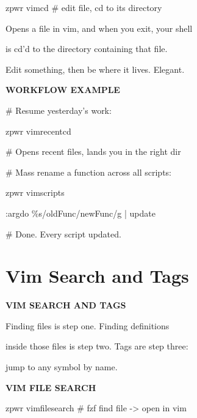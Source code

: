 \documentclass[11pt,a4paper,twoside]{book}
\begin{document}
\begin{codebox}
zpwr vimcd              \# edit file, cd to its directory\\
\end{codebox}

Opens a file in vim, and when you exit, your shell

is cd'd to the directory containing that file.

Edit something, then be where it lives. Elegant.


\vspace{12pt}
{\bfseries\color{neonyellow} WORKFLOW EXAMPLE}\vspace{4pt}

\# Resume yesterday's work:

\begin{codebox}
zpwr vimrecentcd\\
\end{codebox}

\# Opens recent files, lands you in the right dir

\# Mass rename a function across all scripts:

\begin{codebox}
zpwr vimscripts\\
\end{codebox}

:argdo \%s/oldFunc/newFunc/g | update

\# Done. Every script updated.


\vspace{16pt}

\section{Vim Search and Tags}


\vspace{10pt}
{\large\bfseries\color{neoncyan} VIM SEARCH AND TAGS}\vspace{6pt}

Finding files is step one. Finding definitions

inside those files is step two. Tags are step three:

jump to any symbol by name.


\vspace{12pt}
{\bfseries\color{neonyellow} VIM FILE SEARCH}\vspace{4pt}

\begin{codebox}
zpwr vimfilesearch          \# fzf find file -> open in vim\\
\end{codebox}
\end{document}
